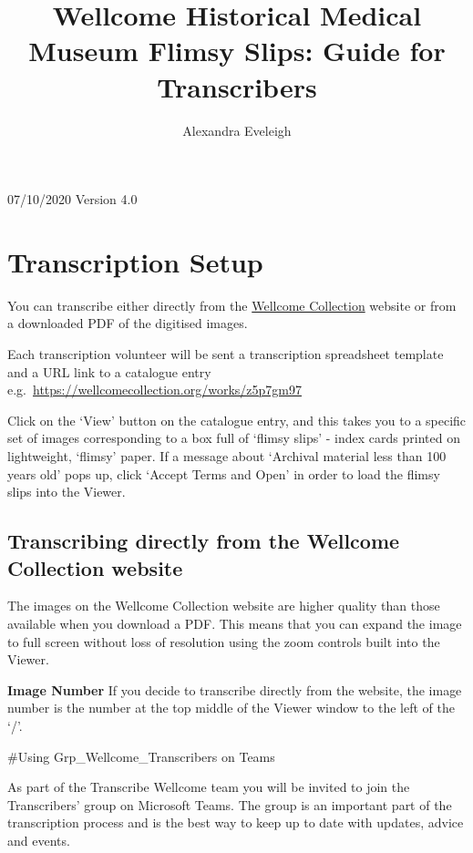 \documentclass[
  openany]{book}
\title{Wellcome Historical Medical Museum Flimsy Slips: Guide for Transcribers}
\author{Alexandra Eveleigh}
\date{}
\begin{document}
\maketitle

{
\setcounter{tocdepth}{1}
\tableofcontents
}
07/10/2020
Version 4.0

\hypertarget{transcription-setup}{%
\chapter{Transcription Setup}\label{transcription-setup}}

You can transcribe either directly from the \href{https://wellcomecollection.org}{Wellcome Collection} website or from a downloaded PDF of the digitised images.

Each transcription volunteer will be sent a transcription spreadsheet template and a URL link to a catalogue entry
e.g.~\url{https://wellcomecollection.org/works/z5p7gm97}

Click on the `View' button on the catalogue entry, and this takes you to a specific set of images corresponding to a box full of `flimsy slips' - index cards printed on lightweight, `flimsy' paper. If a message about `Archival material less than 100 years old' pops up, click `Accept Terms and Open' in order to load the flimsy slips into the Viewer.

\hypertarget{transcribing-directly-from-the-wellcome-collection-website}{%
\section{Transcribing directly from the Wellcome Collection website}\label{transcribing-directly-from-the-wellcome-collection-website}}

The images on the Wellcome Collection website are higher quality than those available when you download a PDF. This means that you can expand the image to full screen without loss of resolution using the zoom controls built into the Viewer.

\textbf{Image Number} If you decide to transcribe directly from the website, the image number is the number at the top middle of the Viewer window to the left of the `/'.

\#Using Grp\_Wellcome\_Transcribers on Teams

As part of the Transcribe Wellcome team you will be invited to join the Transcribers' group on Microsoft Teams. The group is an important part of the transcription process and is the best way to keep up to date with updates, advice and events.
\end{document}
